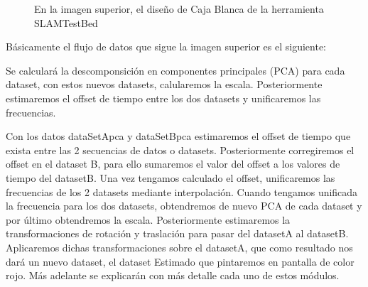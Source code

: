 \begin{figure}[H]
\begin{center}
\hspace{0.5cm}
\end{center}
\caption{ En la imagen superior, el diseño de Caja Blanca de la herramienta SLAMTestBed }
\end{figure}

Básicamente el flujo de datos que sigue la imagen superior es el siguiente:

Se calculará la descomponsición en componentes principales (PCA) para cada dataset, con estos nuevos datasets, calularemos la escala. Posteriormente estimaremos el offset de tiempo entre los dos datasets y unificaremos las frecuencias. 

Con los datos dataSetApca y dataSetBpca estimaremos el offset de tiempo que exista entre las 2 secuencias de datos o datasets. Posteriormente corregiremos el offset en el dataset B, para ello sumaremos el valor del offset a los valores de tiempo del datasetB. Una vez tengamos calculado el offset, unificaremos las frecuencias de los 2 datasets mediante interpolación. Cuando tengamos unificada la frecuencia para los dos datasets, obtendremos de nuevo PCA de cada dataset y por último obtendremos la escala.
Posteriormente estimaremos  la transformaciones de rotación y traslación para pasar del datasetA al datasetB. Aplicaremos dichas transformaciones sobre el datasetA, que como resultado nos dará un nuevo dataset, el dataset Estimado que pintaremos en pantalla de color rojo.
Más adelante se explicarán con más detalle cada uno de estos módulos.



